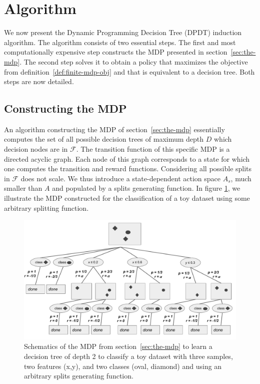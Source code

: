 \section{Algorithm}\label{sec:dpdt}

We now present the Dynamic Programming Decision Tree (DPDT) induction algorithm. 
The algorithm consists of two essential steps. The first and most computationally expensive step constructs the MDP presented in section~\ref{sec:the-mdp}. 
The second step solves it to obtain a policy that maximizes the objective from definition~\ref{def:finite-mdp-obj} and that is equivalent to a decision tree. Both steps are now detailed.

\subsection{Constructing the MDP}

An algorithm constructing the MDP of section~\ref{sec:the-mdp} essentially computes the set of all possible decision trees of maximum depth $D$ which decision nodes are in $\mathcal F$. 
The transition function of this specific MDP is a directed acyclic graph. Each node of this graph corresponds to a state for which one computes the transition and reward functions. 
Considering all possible splits in $\mathcal F$ does not scale.
We thus introduce a state-dependent action space $A_s$, much smaller than $A$ and populated by a splits generating function. In figure \ref{fig:schema-mdp}, we illustrate the MDP constructed for the classification of a toy dataset using some arbitrary splitting function.

\begin{figure}
      \centering
      \includegraphics[width=0.9\linewidth]{images/figures/schema_mdp.pdf}
      \caption{Schematics of the MDP from section~\ref{sec:the-mdp} to learn a decision tree of depth 2 to classify a toy dataset with three samples, two features (x,y), and two classes (oval, diamond) and using an arbitrary splits generating function.}\label{fig:schema-mdp}
      \end{figure}

